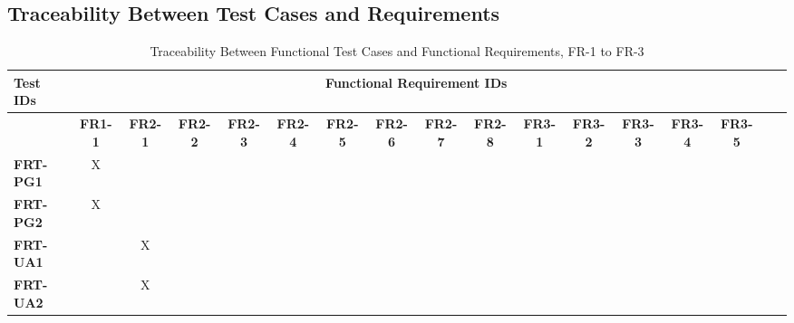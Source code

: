\documentclass[12pt, titlepage]{article}
\begin{document}
\newpage
\begin{landscape}
\subsection{Traceability Between Test Cases and Requirements}
	\footnotesize
	\begin{longtable}{|l|cccccccccccccccc|}
	\caption{Traceability Between Functional Test Cases and Functional Requirements, FR-1 to FR-3}                                                                                                                                                                                                                           \\
		\hline
		\textbf{Test IDs}   & \multicolumn{14}{c|}{\textbf{Functional Requirement IDs}}                                                                                                                                                                                                                 \\
		\hline
		~                   & \textbf{FR1-1}  & \textbf{FR2-1} & \textbf{FR2-2} & \textbf{FR2-3} & \textbf{FR2-4} & \textbf{FR2-5} & \textbf{FR2-6} & \textbf{FR2-7} & \textbf{FR2-8} & \textbf{FR3-1} & \textbf{FR3-2} & \textbf{FR3-3} & \textbf{FR3-4} & \textbf{FR3-5} \\
		\hline
		\textbf{FRT-PG1} & X                                                         & ~             & ~             & ~             & ~             & ~             & ~             & ~             & ~             & ~             & ~             & ~             & ~             & ~             \\
		\textbf{FRT-PG2} & X                                                         & ~             & ~             & ~             & ~             & ~             & ~             & ~             & ~             & ~             & ~             & ~             & ~             & ~             \\
		\textbf{FRT-UA1} & ~                                                         & X             & ~             & ~             & ~             & ~             & ~             & ~             & ~             & ~             & ~             & ~             & ~             & ~             \\
		\textbf{FRT-UA2} & ~                                                         & X             & ~ & ~             & ~             & ~             & ~             & ~             & ~             & ~             & ~             & ~             & ~             & ~             \\

\end{longtable}
\end{landscape}
\end{document}
